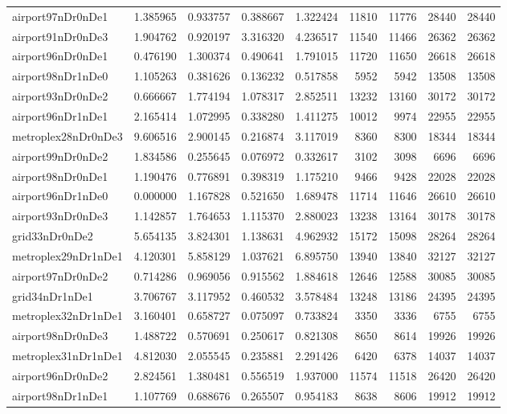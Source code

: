 \begin{longtable}{|l|r|r|r|r|r|r|r|r|}
airport97nDr0nDe1 & 1.385965 & 0.933757 & 0.388667 & 1.322424 & 11810 & 11776 & 28440 & 28440 \\
airport91nDr0nDe3 & 1.904762 & 0.920197 & 3.316320 & 4.236517 & 11540 & 11466 & 26362 & 26362 \\
airport96nDr0nDe1 & 0.476190 & 1.300374 & 0.490641 & 1.791015 & 11720 & 11650 & 26618 & 26618 \\
airport98nDr1nDe0 & 1.105263 & 0.381626 & 0.136232 & 0.517858 & 5952 & 5942 & 13508 & 13508 \\
airport93nDr0nDe2 & 0.666667 & 1.774194 & 1.078317 & 2.852511 & 13232 & 13160 & 30172 & 30172 \\
airport96nDr1nDe1 & 2.165414 & 1.072995 & 0.338280 & 1.411275 & 10012 & 9974 & 22955 & 22955 \\
metroplex28nDr0nDe3 & 9.606516 & 2.900145 & 0.216874 & 3.117019 & 8360 & 8300 & 18344 & 18344 \\
airport99nDr0nDe2 & 1.834586 & 0.255645 & 0.076972 & 0.332617 & 3102 & 3098 & 6696 & 6696 \\
airport98nDr0nDe1 & 1.190476 & 0.776891 & 0.398319 & 1.175210 & 9466 & 9428 & 22028 & 22028 \\
airport96nDr1nDe0 & 0.000000 & 1.167828 & 0.521650 & 1.689478 & 11714 & 11646 & 26610 & 26610 \\
airport93nDr0nDe3 & 1.142857 & 1.764653 & 1.115370 & 2.880023 & 13238 & 13164 & 30178 & 30178 \\
grid33nDr0nDe2 & 5.654135 & 3.824301 & 1.138631 & 4.962932 & 15172 & 15098 & 28264 & 28264 \\
metroplex29nDr1nDe1 & 4.120301 & 5.858129 & 1.037621 & 6.895750 & 13940 & 13840 & 32127 & 32127 \\
airport97nDr0nDe2 & 0.714286 & 0.969056 & 0.915562 & 1.884618 & 12646 & 12588 & 30085 & 30085 \\
grid34nDr1nDe1 & 3.706767 & 3.117952 & 0.460532 & 3.578484 & 13248 & 13186 & 24395 & 24395 \\
metroplex32nDr1nDe1 & 3.160401 & 0.658727 & 0.075097 & 0.733824 & 3350 & 3336 & 6755 & 6755 \\
airport98nDr0nDe3 & 1.488722 & 0.570691 & 0.250617 & 0.821308 & 8650 & 8614 & 19926 & 19926 \\
metroplex31nDr1nDe1 & 4.812030 & 2.055545 & 0.235881 & 2.291426 & 6420 & 6378 & 14037 & 14037 \\
airport96nDr0nDe2 & 2.824561 & 1.380481 & 0.556519 & 1.937000 & 11574 & 11518 & 26420 & 26420 \\
airport98nDr1nDe1 & 1.107769 & 0.688676 & 0.265507 & 0.954183 & 8638 & 8606 & 19912 & 19912 \\

\end{longtable}
